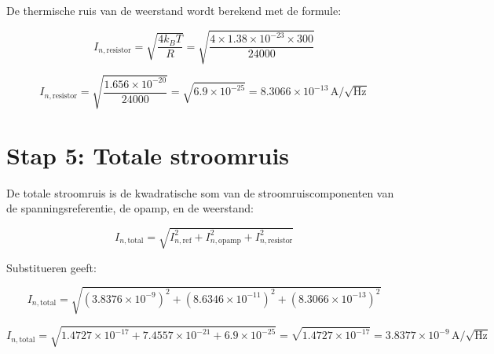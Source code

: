 \documentclass{article}
\begin{document}
	De thermische ruis van de weerstand wordt berekend met de formule:
	
	\begin{equation}
		I_{n,\text{resistor}} = \sqrt{\frac{4 k_B T}{R}} = \sqrt{\frac{4 \times 1.38 \times 10^{-23} \times 300}{24000}}
	\end{equation}
	
	\begin{equation}
		I_{n,\text{resistor}} = \sqrt{\frac{1.656 \times 10^{-20}}{24000}} = \sqrt{6.9 \times 10^{-25}} = 8.3066 \times 10^{-13} \, \text{A}/\sqrt{\text{Hz}}
	\end{equation}
	
	\section{Stap 5: Totale stroomruis}
	
	De totale stroomruis is de kwadratische som van de stroomruiscomponenten van de spanningsreferentie, de opamp, en de weerstand:
	
	\begin{equation}
		I_{n,\text{total}} = \sqrt{I_{n,\text{ref}}^2 + I_{n,\text{opamp}}^2 + I_{n,\text{resistor}}^2}
	\end{equation}
	
	Substitueren geeft:
	
	\begin{equation}
		I_{n,\text{total}} = \sqrt{(3.8376 \times 10^{-9})^2 + (8.6346 \times 10^{-11})^2 + (8.3066 \times 10^{-13})^2}
	\end{equation}
	
	\begin{equation}
		I_{n,\text{total}} = \sqrt{1.4727 \times 10^{-17} + 7.4557 \times 10^{-21} + 6.9 \times 10^{-25}} = \sqrt{1.4727 \times 10^{-17}} = 3.8377 \times 10^{-9} \, \text{A}/\sqrt{\text{Hz}}
	\end{equation}
	
\end{document}
